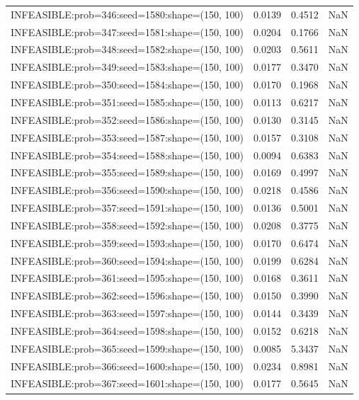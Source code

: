 \begin{longtable}{lccc}
INFEASIBLE:prob=346:seed=1580:shape=(150, 100) &   0.0139 &  0.4512 &    NaN \\
INFEASIBLE:prob=347:seed=1581:shape=(150, 100) &   0.0204 &  0.1766 &    NaN \\
INFEASIBLE:prob=348:seed=1582:shape=(150, 100) &   0.0203 &  0.5611 &    NaN \\
INFEASIBLE:prob=349:seed=1583:shape=(150, 100) &   0.0177 &  0.3470 &    NaN \\
INFEASIBLE:prob=350:seed=1584:shape=(150, 100) &   0.0170 &  0.1968 &    NaN \\
INFEASIBLE:prob=351:seed=1585:shape=(150, 100) &   0.0113 &  0.6217 &    NaN \\
INFEASIBLE:prob=352:seed=1586:shape=(150, 100) &   0.0130 &  0.3145 &    NaN \\
INFEASIBLE:prob=353:seed=1587:shape=(150, 100) &   0.0157 &  0.3108 &    NaN \\
INFEASIBLE:prob=354:seed=1588:shape=(150, 100) &   0.0094 &  0.6383 &    NaN \\
INFEASIBLE:prob=355:seed=1589:shape=(150, 100) &   0.0169 &  0.4997 &    NaN \\
INFEASIBLE:prob=356:seed=1590:shape=(150, 100) &   0.0218 &  0.4586 &    NaN \\
INFEASIBLE:prob=357:seed=1591:shape=(150, 100) &   0.0136 &  0.5001 &    NaN \\
INFEASIBLE:prob=358:seed=1592:shape=(150, 100) &   0.0208 &  0.3775 &    NaN \\
INFEASIBLE:prob=359:seed=1593:shape=(150, 100) &   0.0170 &  0.6474 &    NaN \\
INFEASIBLE:prob=360:seed=1594:shape=(150, 100) &   0.0199 &  0.6284 &    NaN \\
INFEASIBLE:prob=361:seed=1595:shape=(150, 100) &   0.0168 &  0.3611 &    NaN \\
INFEASIBLE:prob=362:seed=1596:shape=(150, 100) &   0.0150 &  0.3990 &    NaN \\
INFEASIBLE:prob=363:seed=1597:shape=(150, 100) &   0.0144 &  0.3439 &    NaN \\
INFEASIBLE:prob=364:seed=1598:shape=(150, 100) &   0.0152 &  0.6218 &    NaN \\
INFEASIBLE:prob=365:seed=1599:shape=(150, 100) &   0.0085 &  5.3437 &    NaN \\
INFEASIBLE:prob=366:seed=1600:shape=(150, 100) &   0.0234 &  0.8981 &    NaN \\
INFEASIBLE:prob=367:seed=1601:shape=(150, 100) &   0.0177 &  0.5645 &    NaN \\

\end{longtable}
